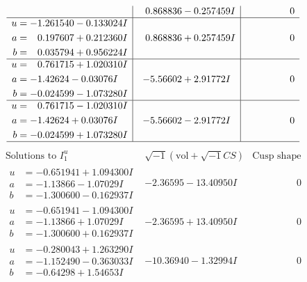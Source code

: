\documentclass[1p]{elsarticle_modified}
\theoremstyle{definition}
\newcommand{\I}{\sqrt{-1}}
\begin{document}
$$\begin{array}{c|c|c}
 & \phantom{-}0.868836 - 0.257459 I & \phantom{-0.000000 } 0 \\ \hline\begin{aligned}
u &= -1.261540 - 0.133024 I \\
a &= \phantom{-}0.197607 + 0.212360 I \\
b &= \phantom{-}0.035794 + 0.956224 I\end{aligned}
 & \phantom{-}0.868836 + 0.257459 I & \phantom{-0.000000 } 0 \\ \hline\begin{aligned}
u &= \phantom{-}0.761715 + 1.020310 I \\
a &= -1.42624 - 0.03076 I \\
b &= -0.024599 - 1.073280 I\end{aligned}
 & -5.56602 + 2.91772 I & \phantom{-0.000000 } 0 \\ \hline\begin{aligned}
u &= \phantom{-}0.761715 - 1.020310 I \\
a &= -1.42624 + 0.03076 I \\
b &= -0.024599 + 1.073280 I\end{aligned}
 & -5.56602 - 2.91772 I & \phantom{-0.000000 } 0\\
 \hline 
 \end{array}$$\newpage$$\begin{array}{c|c|c}  
\text{Solutions to }I^u_{1}& \I (\text{vol} + \sqrt{-1}CS) & \text{Cusp shape}\\
 \hline 
\begin{aligned}
u &= -0.651941 + 1.094300 I \\
a &= -1.13866 - 1.07029 I \\
b &= -1.300600 - 0.162937 I\end{aligned}
 & -2.36595 - 13.40950 I & \phantom{-0.000000 } 0 \\ \hline\begin{aligned}
u &= -0.651941 - 1.094300 I \\
a &= -1.13866 + 1.07029 I \\
b &= -1.300600 + 0.162937 I\end{aligned}
 & -2.36595 + 13.40950 I & \phantom{-0.000000 } 0 \\ \hline\begin{aligned}
u &= -0.280043 + 1.263290 I \\
a &= -1.152490 - 0.363033 I \\
b &= -0.64298 + 1.54653 I\end{aligned}
 & -10.36940 - 1.32994 I & \phantom{-0.000000 } 0 \\ \hline\begin{aligned}

\end{aligned}
\end{array}$$
\end{document}
